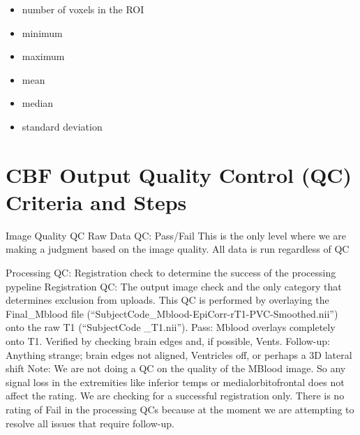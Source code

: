 \documentclass[letterpaper,11pt]{article}
\begin{document}
\begin{table}[H]
\begin{itemize} 
\item number of voxels in the ROI
\item minimum  
\item maximum  
\item mean     
\item median   
\item standard deviation 
\end{itemize}
\end{table}

\section*{CBF Output Quality Control (QC) Criteria and Steps}
\begin{outline}[enumerate]
\1	Image Quality QC
\2  Raw Data QC: Pass/Fail
\3	This is the only level where we are making a judgment based on the image quality.
\3	All data is run regardless of QC

\1	Processing QC: Registration check to determine the success of the processing pypeline
\2	Registration QC: The output image check and the only category that determines exclusion from uploads. 
\3	This QC is performed by overlaying the Final\_Mblood file (``SubjectCode\_Mblood-EpiCorr-rT1-PVC-Smoothed.nii'') onto the raw T1            (``SubjectCode \_T1.nii'').  
\3	Pass: Mblood overlays completely onto T1.  Verified by checking brain edges and, if possible, Vents.
\3	Follow-up:  Anything strange; brain edges not aligned, Ventricles off, or perhaps a 3D lateral shift
\3  Note: We are not doing a QC on the quality of the MBlood image.  So any signal loss in the extremities like inferior temps or           medialorbitofrontal does not affect the rating.  We are checking for a successful registration only.
\2	There is no rating of Fail in the processing QCs because at the moment we are attempting to resolve all issues that require             follow-up.
\end{outline}

\vspace*{1cm}
\end{document}
